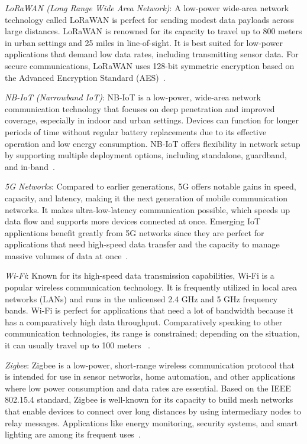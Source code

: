 \documentclass[conference]{IEEEtran}
\begin{document}
\textit{LoRaWAN (Long Range Wide Area Network)}: A low-power wide-area network technology called LoRaWAN is perfect for sending modest data payloads across large distances. LoRaWAN is renowned for its capacity to travel up to 800 meters in urban settings and 25 miles in line-of-sight. It is best suited for low-power applications that demand low data rates, including transmitting sensor data. For secure communications, LoRaWAN uses 128-bit symmetric encryption based on the Advanced Encryption Standard (AES)~\cite{smartcities4020024}.

\textit{NB-IoT (Narrowband IoT)}: NB-IoT is a low-power, wide-area network communication technology that focuses on deep penetration and improved coverage, especially in indoor and urban settings. Devices can function for longer periods of time without regular battery replacements due to its effective operation and low energy consumption. NB-IoT offers flexibility in network setup by supporting multiple deployment options, including standalone, guardband, and in-band~\cite{9023471}.

\textit{5G Networks}: Compared to earlier generations, 5G offers notable gains in speed, capacity, and latency, making it the next generation of mobile communication networks. It makes ultra-low-latency communication possible, which speeds up data flow and supports more devices connected at once. Emerging IoT applications benefit greatly from 5G networks since they are perfect for applications that need high-speed data transfer and the capacity to manage massive volumes of data at once~\cite{8752482}.

\textit{Wi-Fi}: Known for its high-speed data transmission capabilities, Wi-Fi is a popular wireless communication technology. It is frequently utilized in local area networks (LANs) and runs in the unlicensed 2.4 GHz and 5 GHz frequency bands. Wi-Fi is perfect for applications that need a lot of bandwidth because it has a comparatively high data throughput. Comparatively speaking to other communication technologies, its range is constrained; depending on the situation, it can usually travel up to 100 meters ~\cite{10474733}.

\textit{Zigbee}: Zigbee is a low-power, short-range wireless communication protocol that is intended for use in sensor networks, home automation, and other applications where low power consumption and data rates are essential. Based on the IEEE 802.15.4 standard, Zigbee is well-known for its capacity to build mesh networks that enable devices to connect over long distances by using intermediary nodes to relay messages. Applications like energy monitoring, security systems, and smart lighting are among its frequent uses~\cite{8458217}.
\end{document}
